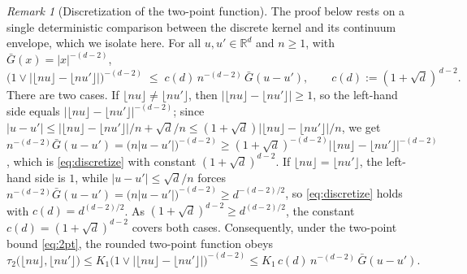 \documentclass[11pt]{article}
\theoremstyle{definition}
\theoremstyle{remark}
\newtheorem{remark}[theorem]{Remark}
\newcommand{\R}{\mathbb{R}}
\newcommand{\fl}[1]{\lfloor #1\rfloor}
\numberwithin{equation}{section}
\theoremstyle{plain}
\theoremstyle{definition}
\theoremstyle{remark}
\theoremstyle{plain}
\begin{document}
\begin{remark}[Discretization of the two-point function]
\label{rem:discretize}
The proof below rests on a single deterministic comparison between the
discrete kernel and its continuum envelope, which we isolate here. For all
$u,u'\in\R^d$ and $n\ge1$, with $\bar G(x)=|x|^{-(d-2)}$,
\begin{equation}\label{eq:discretize}
\bigl(1\vee|\fl{nu}-\fl{nu'}|\bigr)^{-(d-2)}
\;\le\; c(d)\,n^{-(d-2)}\,\bar G(u-u'),
\qquad c(d):=(1+\sqrt d)^{\,d-2}.
\end{equation}
There are two cases. If $\fl{nu}\neq\fl{nu'}$, then $|\fl{nu}-\fl{nu'}|\ge1$,
so the left-hand side equals $|\fl{nu}-\fl{nu'}|^{-(d-2)}$; since
$|u-u'|\le|\fl{nu}-\fl{nu'}|/n+\sqrt d/n\le(1+\sqrt d)|\fl{nu}-\fl{nu'}|/n$, we
get $n^{-(d-2)}\bar G(u-u')=\bigl(n|u-u'|\bigr)^{-(d-2)}\ge(1+\sqrt
d)^{-(d-2)}|\fl{nu}-\fl{nu'}|^{-(d-2)}$, which is \eqref{eq:discretize} with
constant $(1+\sqrt d)^{d-2}$. If $\fl{nu}=\fl{nu'}$, the left-hand side is $1$,
while $|u-u'|\le\sqrt d/n$ forces
$n^{-(d-2)}\bar G(u-u')=\bigl(n|u-u'|\bigr)^{-(d-2)}\ge d^{-(d-2)/2}$, so
\eqref{eq:discretize} holds with $c(d)=d^{(d-2)/2}$. As $(1+\sqrt d)^{d-2}\ge
d^{(d-2)/2}$, the constant $c(d)=(1+\sqrt d)^{d-2}$ covers both cases.
Consequently, under the two-point bound \eqref{eq:2pt}, the rounded
two-point function obeys
\begin{equation}\label{eq:tauenvelope}
\tau_2\bigl(\fl{nu},\fl{nu'}\bigr)
\le K_1\bigl(1\vee|\fl{nu}-\fl{nu'}|\bigr)^{-(d-2)}
\le K_1\,c(d)\,n^{-(d-2)}\,\bar G(u-u') .
\end{equation}
\end{remark}
\end{document}
